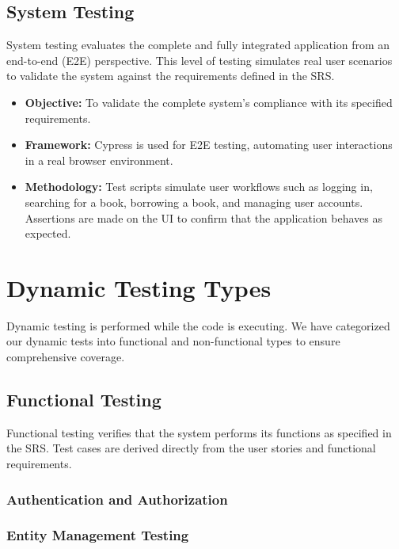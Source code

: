 \subsection{System Testing}
System testing evaluates the complete and fully integrated application from an end-to-end (E2E) perspective. This level of testing simulates real user scenarios to validate the system against the requirements defined in the SRS.
\begin{itemize}
    \item \textbf{Objective:} To validate the complete system's compliance with its specified requirements.
    \item \textbf{Framework:} Cypress is used for E2E testing, automating user interactions in a real browser environment.
    \item \textbf{Methodology:} Test scripts simulate user workflows such as logging in, searching for a book, borrowing a book, and managing user accounts. Assertions are made on the UI to confirm that the application behaves as expected.
\end{itemize}


\section{Dynamic Testing Types}
Dynamic testing is performed while the code is executing. We have categorized our dynamic tests into functional and non-functional types to ensure comprehensive coverage.

\subsection{Functional Testing}
Functional testing verifies that the system performs its functions as specified in the SRS. Test cases are derived directly from the user stories and functional requirements.
\subsubsection{Authentication and Authorization}


\subsubsection{Entity Management Testing}


